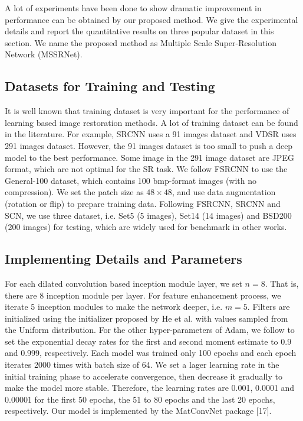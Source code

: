 \documentclass{article}
\begin{document}
A lot of experiments have been done to show dramatic improvement in performance can be obtained by our proposed method. We give the experimental details and report the quantitative results on three popular dataset in this section. We name the proposed method as Multiple Scale Super-Resolution Network (MSSRNet).

\subsection{Datasets for Training and Testing}
\label{subsec:datasets}

It is well known that training dataset is very important for the performance of learning based image restoration methods. A lot of training dataset can be found in the literature. For example, SRCNN \cite{ref4,ref5} uses a 91 images dataset and VDSR \cite{ref9} uses 291 images dataset. However, the 91 images dataset is too small to push a deep model to the best performance. Some image in the 291 image dataset are JPEG format, which are not optimal for the SR task. We follow FSRCNN \cite{ref7} to use the General-100 dataset, which contains 100 bmp-format images (with no compression). We set the patch size as $48 \times 48$, and use data augmentation (rotation or flip) to prepare training data. Following FSRCNN, SRCNN and SCN, we use three dataset, i.e. Set5 \cite{ref18} (5 images), Set14 \cite{ref19} (14 images) and BSD200 \cite{ref20} (200 images) for testing, which are widely used for benchmark in other works.

\subsection{Implementing Details and Parameters}
\label{subsec:implementing}

For each dilated convolution based inception module layer, we set $n = 8$. That is, there are 8 inception module per layer. For feature enhancement process, we iterate 5 inception modules to make the network deeper, i.e. $m = 5$. Filters are initialized using the initializer proposed by He et al. \cite{ref21} with values sampled from the Uniform distribution. For the other hyper-parameters of Adam, we follow \cite{refadd1} to set the exponential decay rates for the first and second moment estimate to 0.9 and 0.999, respectively. Each model was trained only 100 epochs and each epoch iterates 2000 times with batch size of 64. We set a lager learning rate in the initial training phase to accelerate convergence, then decrease it gradually to make the model more stable. Therefore, the learning rates are 0.001, 0.0001 and 0.00001 for the first 50 epochs, the 51 to 80 epochs and the last 20 epochs, respectively. Our model is implemented by the MatConvNet package [17].
\end{document}

